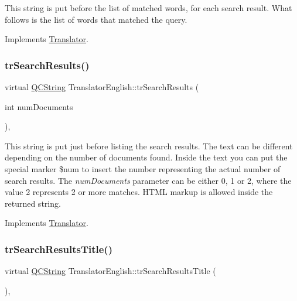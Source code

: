 This string is put before the list of matched words, for each search result. What follows is the list of words that matched the query. 

Implements \mbox{\hyperlink{class_translator}{Translator}}.

\mbox{\label{class_translator_english_aff5c0c2780dce8daf3cb4ba471f2fbc8}} 
\subsubsection{\texorpdfstring{trSearchResults()}{trSearchResults()}}
{\footnotesize\ttfamily virtual \mbox{\hyperlink{class_q_c_string}{Q\+C\+String}} Translator\+English\+::tr\+Search\+Results (\begin{DoxyParamCaption}\item[{int}]{num\+Documents }\end{DoxyParamCaption})\hspace{0.3cm}{\ttfamily [inline]}, {\ttfamily [virtual]}}

This string is put just before listing the search results. The text can be different depending on the number of documents found. Inside the text you can put the special marker \$num to insert the number representing the actual number of search results. The {\itshape num\+Documents} parameter can be either 0, 1 or 2, where the value 2 represents 2 or more matches. H\+T\+ML markup is allowed inside the returned string. 

Implements \mbox{\hyperlink{class_translator}{Translator}}.

\mbox{\label{class_translator_english_a72b459d05f241e8f51e3c3fc407d4793}} 
\subsubsection{\texorpdfstring{trSearchResultsTitle()}{trSearchResultsTitle()}}
{\footnotesize\ttfamily virtual \mbox{\hyperlink{class_q_c_string}{Q\+C\+String}} Translator\+English\+::tr\+Search\+Results\+Title (\begin{DoxyParamCaption}{ }\end{DoxyParamCaption})\hspace{0.3cm}{\ttfamily [inline]}, {\ttfamily [virtual]}}

